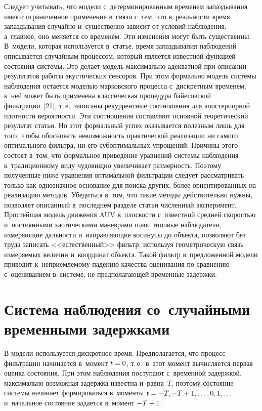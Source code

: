\begin{multicols}{2}
     Следует учитывать, что модели с~детерминированным временем 
за\-паз\-ды\-ва\-ния имеют ограниченное применение в~связи с~тем, что 
в~ре\-аль\-ности время за\-паз\-ды\-ва\-ния случайно и~существенно зависит от 
условий наблюдения, а~главное, оно меняется со временем. Эти изменения 
могут быть существенны. В~модели, которая используется в~статье, время 
за\-паз\-ды\-ва\-ния наблюдений описывается случайным процессом, который 
является известной функцией со\-сто\-яния сис\-те\-мы. Это делает модель 
максимально адекватной при описании результатов работы акус\-ти\-че\-ских 
сенсоров. При этом формально модель сис\-те\-мы наблюдения остается 
мо\-делью марковского процесса с~дискретным временем, к~ней может быть 
применена классическая процедура байесовской фильт\-ра\-ции~[21], т.\,е.\ 
записаны рекуррентные соотношения для апостериорной плот\-ности 
ве\-ро\-ят\-ности. Эти соотношения со\-став\-ля\-ют основной тео\-ре\-ти\-че\-ский 
результат \mbox{статьи}. Но этот формальный успех оказывается полезным лишь для 
того, чтобы обосновать не\-воз\-мож\-ность практической реализации ни самого 
оптимального фильт\-ра, ни его субоптимальных упрощений. Причины этого 
со\-сто\-ят в~том, что формальное приведение урав\-не\-ний сис\-те\-мы наблюдения 
к~традиционному виду чу\-до\-вищ\-но увеличивает раз\-мер\-ность. Поэтому 
полученные ниже урав\-не\-ния оптимальной фильт\-ра\-ции следует 
рас\-смат\-ри\-вать только как однозначное осно\-ва\-ние для поиска других, более 
ориентированных на реализацию методов. Убедиться в~том, что такие 
методы действительно нуж\-ны, поз\-во\-ля\-ет описанный в~по\-след\-нем разделе 
статьи чис\-лен\-ный эксперимент. Прос\-тей\-шая модель движения AUV 
в~плос\-кости с~известной средней ско\-ростью и~постоянными хаотическими 
маневрами плюс типовые наблюдатели, из\-ме\-ря\-ющие дальности  
и~на\-прав\-ля\-ющие косинусы до объекта, поз\-во\-ля\-ют без труда записать 
<<естественный>> фильтр, используя гео\-мет\-ри\-че\-скую связь из\-ме\-ря\-емых 
величин и~координат объекта. Такой фильтр в~предложенной модели 
приводит к~не\-при\-ем\-ле\-мо\-му падению качества оценивания по сравнению 
с~оцениванием в~сис\-те\-ме, не пред\-по\-ла\-га\-ющей временн$\acute{\mbox{ы}}$е за\-держки. 

\section{Система наблюдения со~случайными временными задержками}

     В модели используется дискретное время. Предполагается, что процесс 
фильт\-ра\-ции начинается в~момент $t\hm=0$, т.\,е.\ в~этот момент вы\-чис\-ля\-ет\-ся 
пер\-вая оцен\-ка со\-сто\-яния. При этом наблюдения по\-сту\-па\-ют с~временн$\acute{\mbox{о}}$й 
за\-держ\-кой, максимально воз\-мож\-ная за\-держ\-ка известна и~рав\-на~$T$, поэтому 
со\-сто\-яние сис\-те\-мы начинает формироваться в~моменты $t\hm= -T, -T+1, 
\ldots , 0, 1, \ldots$ и~начальное со\-сто\-яние задается в~момент $-T\hm-1$.
     

\end{multicols}
